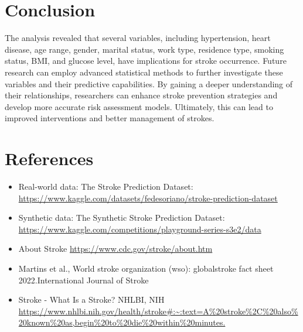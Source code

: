\documentclass{article}
\begin{document}
\section{Conclusion}
The analysis revealed that several variables, including hypertension, heart disease, age range, gender, marital status, work type, residence type, smoking status, BMI, and glucose level, have implications for stroke occurrence. Future research can employ advanced statistical methods to further investigate these variables and their predictive capabilities. By gaining a deeper understanding of their relationships, researchers can enhance stroke prevention strategies and develop more accurate risk assessment models. Ultimately, this can lead to improved interventions and better management of strokes.
\section{References}
\begin{itemize}
    \item Real-world data: The Stroke Prediction Dataset: \url{https://www.kaggle.com/datasets/fedesoriano/stroke-prediction-dataset}
    \item Synthetic data: The Synthetic Stroke Prediction Dataset: \url{https://www.kaggle.com/competitions/playground-series-s3e2/data} 
    \item About Stroke \url{https://www.cdc.gov/stroke/about.htm}
    \item Martins et al., World stroke organization (wso): globalstroke fact sheet 2022.International Journal of Stroke 
    \item Stroke - What Is a Stroke? NHLBI, NIH  \url{https://www.nhlbi.nih.gov/health/stroke#:~:text=A%20stroke%2C%20also%20known%20as,begin%20to%20die%20within%20minutes.}
\end{itemize}
\end{document}
